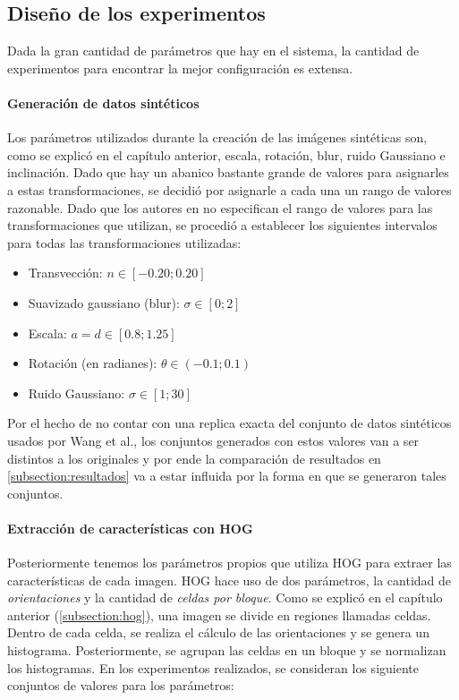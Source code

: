 \subsection{Diseño de los experimentos}

	Dada la gran cantidad de parámetros que hay en el sistema, la cantidad de experimentos para encontrar la mejor configuración es extensa.

        \paragraph{Generación de datos sintéticos}

	Los parámetros utilizados durante la creación de las imágenes sintéticas son, como se explicó en el capítulo anterior, escala, rotación, blur, ruido Gaussiano e inclinación. Dado que hay un abanico bastante grande de valores para asignarles a estas transformaciones, se decidió por asignarle a cada una un rango de valores razonable. Dado que los autores en \cite{wang} no especifican el rango de valores para las transformaciones que utilizan, se procedió a establecer los siguientes intervalos para todas las transformaciones utilizadas:
	
	\begin{itemize}
		\item Transvección: $n \in [-0.20 ; 0.20]$
		\item Suavizado gaussiano (blur): $\sigma \in [0 ; 2]$
		\item Escala: $a=d \in [0.8; 1.25]$
		\item Rotación (en radianes): $\theta \in (-0.1; 0.1)$
		\item Ruido Gaussiano: $\sigma \in [1; 30]$
	\end{itemize}
	
	Por el hecho de no contar con una replica exacta del conjunto de datos sintéticos usados por Wang et al., los conjuntos generados con estos valores van a ser distintos a los originales y por ende la comparación de resultados  en \ref{subsection:resultados} va a estar influida por la forma en que se generaron tales conjuntos.
	
	\paragraph{Extracción de características con HOG}

	Posteriormente tenemos los parámetros propios que utiliza HOG para extraer las características de cada imagen. HOG hace uso de dos parámetros, la cantidad de \textit{orientaciones} y la cantidad de \textit{celdas por bloque}. Como se explicó en el capítulo anterior (\ref{subsection:hog}), una imagen se divide en regiones llamadas celdas. Dentro de cada celda, se realiza el cálculo de las orientaciones y se genera un histograma. Posteriormente, se agrupan las celdas en un bloque y se normalizan los histogramas. En los experimentos realizados, se consideran los siguiente conjuntos de valores para los parámetros:
	
